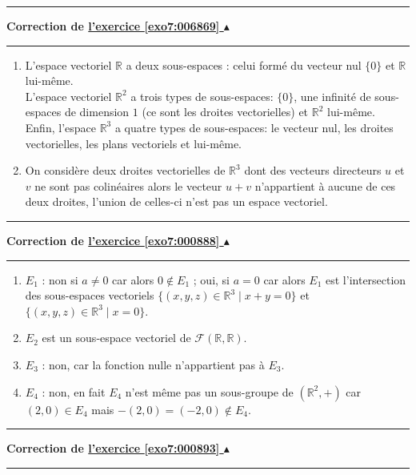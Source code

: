 \documentclass[11pt,a4paper]{article}
\newcommand{\Rr}{\mathbb{R}} \newcommand{\R}{\mathbb{R}}
\newcounter{exo}
\newcommand{\correction}[1]{\hypertarget{cor7:#1}{}\label{cor7:#1}{\bf Correction de \hyperlink{exo7:#1}{l'exercice \ref{exo7:#1} $\blacktriangle$}}\vspace{1mm}\hrule\vspace{1mm}}
\newcommand{\fincorrection}{\vspace{1mm}\hrule\vspace*{7mm}}
\begin{document}
\fincorrection
\correction{006869}
\begin{enumerate}
  \item L'espace vectoriel $\mathbb{R}$ a deux sous-espaces : celui formé du vecteur nul $\{0\}$  et $\Rr$ lui-m\^eme.
\\
L'espace vectoriel $\mathbb{R}^2$ a trois types de sous-espaces: $\{0\}$, 
une infinit\'e de sous-espaces de dimension $1$ (ce sont les droites vectorielles) et $\Rr^2$ lui-m\^eme.
\\
Enfin, l'espace $\mathbb{R}^3$ a quatre types de sous-espaces: le vecteur nul, les droites vectorielles, 
les plans vectoriels et lui-m\^eme.

  \item On consid\`ere deux droites vectorielles de $\mathbb{R}^3$ dont des vecteurs directeurs 
$u$ et $v$ ne sont pas colin\'eaires alors le vecteur $u+v$ n'appartient 
\`a aucune de ces deux droites, l'union de celles-ci n'est pas un espace vectoriel.
\end{enumerate}
\fincorrection
\correction{000888}
\begin{enumerate}
\item $E_1$ : non si $a \neq 0$ car alors $0 \notin E_1$ ; oui, si $a
  = 0$ car alors $E_1$ est l'intersection des sous-espaces vectoriels
  $\{(x,y,z)\in \Rr^3 \mid x+y=0 \}$ et $\{(x,y,z)\in \Rr^3 \mid x=0 \}$.
\item $E_2$ est un sous-espace vectoriel de $\mathcal{F}(\Rr,\Rr)$.
\item $E_3$ : non, car la fonction nulle n'appartient pas \`a $E_3$.
\item $E_4$ : non, en fait $E_4$ n'est m\^eme pas un sous-groupe de
  $(\Rr^2,+)$ car $(2,0)\in E_4$ mais $-(2,0)=(-2,0) \notin E_4$.
\end{enumerate}
\fincorrection
\correction{000893}
\end{document}
